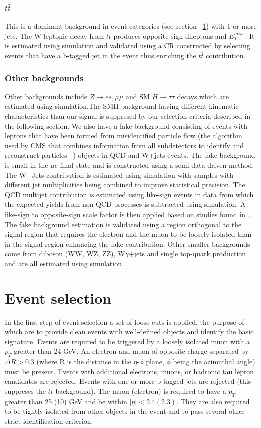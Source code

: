 \documentclass[a4paper,11pt]{article}
\begin{document}
\subsubsection{$t\bar{t}$}
This is a dominant background in event categories (see section ~\ref{sec:selection}) with 1 or more jets. The W leptonic decay from $t\bar{t}$ produces opposite-sign dileptons and $E_{T}^{miss}$. It is estimated using simulation and validated using a CR constructed by selecting events that have a b-tagged jet in the event thus enriching the $t\bar{t}$ contribution.
\subsubsection{Other backgrounds}
Other backgrounds include $Z\rightarrow ee,\mu\mu$  and SM $H\rightarrow \tau\tau$ decays which  are estimated using simulation.The SMH background having different kinematic characteristics than our signal is suppresed by our selection criteria described in the following section. We also have a fake background consisting of events with leptons that have been formed from misidentified particle flow (the algorithm used by CMS that combines information from all subdetectors to identify and reconstruct particles ~\cite{i}) objects in QCD and W+jets events. The fake background is small in the $\mu e$ final state and is constructed using a semi-data driven method. The W+Jets contribution is estimated using simulation with samples with different jet multiplicities being combined to improve statistical precision. The QCD multijet contribution is estimated using like-sign events in data from which the expected yields from non-QCD processes is subtracted using simulation. A like-sign to opposite-sign scale factor is then applied based on studies found in~\cite{j}. The fake background estimation is validated using a region orthogonal to the signal region that requires the electron and the muon to be loosely isolated than in the signal region enhancing the fake contribution. Other smaller backgrounds come from diboson (WW, WZ, ZZ), W$\gamma$+jets and single top-quark production and are all estimated using simulation.  


\section {Event selection}
\label{sec:selection}
In the first step of event selection a set of loose cuts is applied, the purpose of which are to provide clean events with well-defined objects and identify the basic signature. Events are required to be triggered by a loosely isolated muon with a $p_{T}$ greater than 24 GeV. An electron and muon of opposite charge separated by $\Delta R > 0.3$ (where R is the distance in the $\eta$-$\phi$ plane, $\phi$ being the azimuthal angle) must be present. Events with additional electrons, muons, or hadronic tau lepton candidates are rejected. Events with one or more b-tagged jets are rejected (this suppreses the $t\bar{t}$ background). The muon (electron) is required to have a $p_{T}$ greater than 25 (10) GeV and be within $|\eta|<2.4(2.3)$. They are also required to be tightly isolated from other objects in the event and to pass several other strict identification criterion.\\
\end{document}
